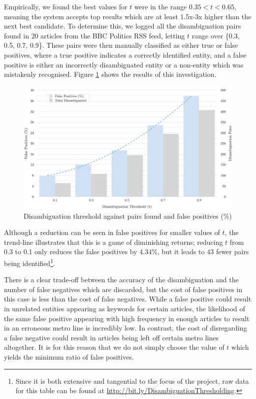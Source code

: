 Empirically, we found the best values for $t$ were in the range $0.35 < t < 0.65$, meaning the system accepts top results which are at least 1.5x-3x higher than the next best candidate. To determine this, we logged all the disambiguation pairs found in 20 articles from the BBC Politics RSS feed, letting $t$ range over \{0.3, 0.5, 0.7, 0.9\}. These pairs were then manually classified as either true or false positives, where a true positive indicates a correctly identified entity, and a false positive is either an incorrectly disambiguated entity or a non-entity which was mistakenly recognised. Figure \ref{fig:dthreshold} shows the results of this investigation.\\

\begin{figure}[htbp!]
	\centering
	\includegraphics[width=\textwidth]{img/implementation/DisambiguationThreshold.pdf}
	\caption{Disambiguation threshold against pairs found and false positives (\%)}
	\label{fig:dthreshold}
\end{figure}

Although a reduction can be seen in false positives for smaller values of $t$, the trend-line illustrates that this is a game of diminishing returns; reducing $t$ from 0.3 to 0.1 only reduces the false positives by 4.34\%, but it leads to 43 fewer pairs being identified\footnote{Since it is both extensive and tangential to the focus of the project, raw data for this table can be found at \url{http://bit.ly/DisambiguationThresholding}.}. 

There is a clear trade-off between the accuracy of the disambiguation and the number of false negatives which are discarded, but the cost of false positives in this case is less than the cost of false negatives. While a false positive could result in unrelated entities appearing as keywords for certain articles, the likelihood of the same false positive appearing with high frequency in enough articles to result in an erroneous metro line is incredibly low. In contrast, the cost of disregarding a false negative could result in articles being left off certain metro lines altogether. It is for this reason that we do not simply choose the value of $t$ which yields the minimum ratio of false positives.

